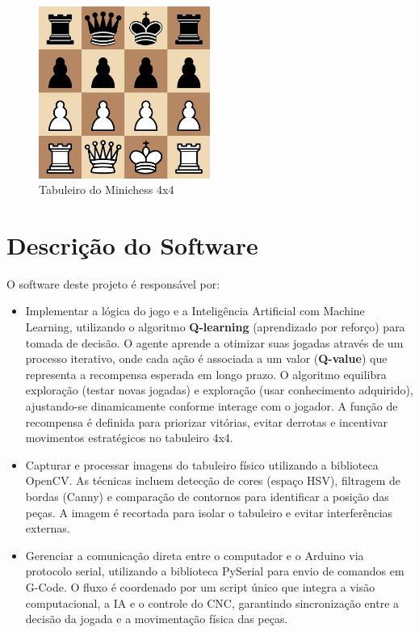 \documentclass[a4paper,12pt]{article}
\begin{document}
\begin{figure}[H]  
    \centering  
    \includegraphics[width=0.5\textwidth]{images/minichess4x4.png}   
    \caption{Tabuleiro do Minichess 4x4}  
    \label{fig:modelo_cnc}  
\end{figure}  

\vspace{1em}  

\section{Descrição do Software}  
O software deste projeto é responsável por:  
\begin{itemize}  
    \item Implementar a lógica do jogo e a Inteligência Artificial com Machine Learning, utilizando o algoritmo \textbf{Q-learning} (aprendizado por reforço) para tomada de decisão. O agente aprende a otimizar suas jogadas através de um processo iterativo, onde cada ação é associada a um valor (\textbf{Q-value}) que representa a recompensa esperada em longo prazo. O algoritmo equilibra exploração (testar novas jogadas) e exploração (usar conhecimento adquirido), ajustando-se dinamicamente conforme interage com o jogador. A função de recompensa é definida para priorizar vitórias, evitar derrotas e incentivar movimentos estratégicos no tabuleiro 4x4.  

    \item Capturar e processar imagens do tabuleiro físico utilizando a biblioteca OpenCV. As técnicas incluem detecção de cores (espaço HSV), filtragem de bordas (Canny) e comparação de contornos para identificar a posição das peças. A imagem é recortada para isolar o tabuleiro e evitar interferências externas.  

    \item Gerenciar a comunicação direta entre o computador e o Arduino via protocolo serial, utilizando a biblioteca PySerial para envio de comandos em G-Code. O fluxo é coordenado por um script único que integra a visão computacional, a IA e o controle do CNC, garantindo sincronização entre a decisão da jogada e a movimentação física das peças.  
\end{itemize}  
\end{document}
